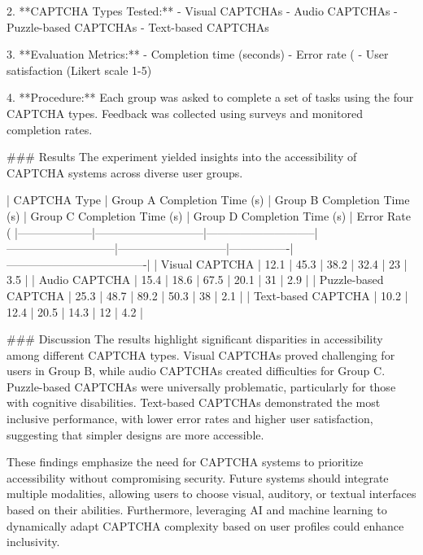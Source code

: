 2. **CAPTCHA Types Tested:**  
   - Visual CAPTCHAs  
   - Audio CAPTCHAs  
   - Puzzle-based CAPTCHAs  
   - Text-based CAPTCHAs  

3. **Evaluation Metrics:**  
   - Completion time (seconds)  
   - Error rate (%
   - User satisfaction (Likert scale 1-5)  

4. **Procedure:**  
   Each group was asked to complete a set of tasks using the four CAPTCHA types. Feedback was collected using surveys and monitored completion rates.  

### Results  
The experiment yielded insights into the accessibility of CAPTCHA systems across diverse user groups.  

| CAPTCHA Type       | Group A Completion Time (s) | Group B Completion Time (s) | Group C Completion Time (s) | Group D Completion Time (s) | Error Rate (%
|--------------------|-----------------------------|-----------------------------|-----------------------------|-----------------------------|----------------|-------------------------------------|  
| Visual CAPTCHA     | 12.1                       | 45.3                       | 38.2                       | 32.4                       | 23             | 3.5                                 |  
| Audio CAPTCHA      | 15.4                       | 18.6                       | 67.5                       | 20.1                       | 31             | 2.9                                 |  
| Puzzle-based CAPTCHA | 25.3                     | 48.7                       | 89.2                       | 50.3                       | 38             | 2.1                                 |  
| Text-based CAPTCHA | 10.2                       | 12.4                       | 20.5                       | 14.3                       | 12             | 4.2                                 |  

### Discussion  
The results highlight significant disparities in accessibility among different CAPTCHA types. Visual CAPTCHAs proved challenging for users in Group B, while audio CAPTCHAs created difficulties for Group C. Puzzle-based CAPTCHAs were universally problematic, particularly for those with cognitive disabilities. Text-based CAPTCHAs demonstrated the most inclusive performance, with lower error rates and higher user satisfaction, suggesting that simpler designs are more accessible.  

These findings emphasize the need for CAPTCHA systems to prioritize accessibility without compromising security. Future systems should integrate multiple modalities, allowing users to choose visual, auditory, or textual interfaces based on their abilities. Furthermore, leveraging AI and machine learning to dynamically adapt CAPTCHA complexity based on user profiles could enhance inclusivity.  

